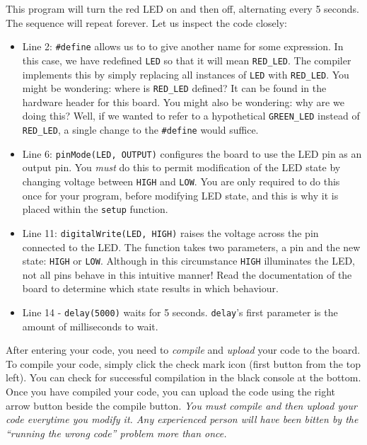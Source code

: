 \documentclass{article}
\begin{document}
This program will turn the red LED on and then off, alternating every 5 seconds.  The sequence will repeat forever.  Let us inspect the code closely:
\begin{itemize}
	\item Line 2: \texttt{\#define} allows us to to give another name for some expression. In this case, we have redefined \texttt{LED} so that it will mean \texttt{RED\_LED}. The compiler implements this by simply replacing all instances of \texttt{LED} with \texttt{RED\_LED}. You might be wondering: where is \texttt{RED\_LED} defined? It can be found in the hardware header for this board. You might also be wondering: why are we doing this? Well, if we wanted to refer to a hypothetical \texttt{GREEN\_LED} instead of \texttt{RED\_LED}, a single change to the \texttt{\#define} would suffice.

	\item Line 6: \texttt{pinMode(LED, OUTPUT)} configures the board to use the LED pin as an output pin.  You \emph{must} do this to permit modification of the LED state by changing voltage between \texttt{HIGH} and \texttt{LOW}.  You are only required to do this once for your program, before modifying LED state, and this is why it is placed within the \texttt{setup} function.

	\item Line 11: \texttt{digitalWrite(LED, HIGH)} raises the voltage across the pin connected to the LED.  The function takes two parameters, a pin and the new state: \texttt{HIGH} or \texttt{LOW}.  Although in this circumstance \texttt{HIGH} illuminates the LED, not all pins behave in this intuitive manner!  Read the documentation of the board to determine which state results in which behaviour.

	\item Line 14 - \texttt{delay(5000)} waits for 5 seconds. \texttt{delay}'s first parameter is the amount of milliseconds to wait.

\end{itemize}

After entering your code, you need to \emph{compile} and \emph{upload} your code to the board.  To compile your code, simply click the check mark icon (first button from the top left).  You can check for successful compilation in the black console at the bottom.  Once you have compiled your code, you can upload the code using the right arrow button beside the compile button.  \emph{You must compile and then upload your code everytime you modify it. Any experienced person will have been bitten by the ``running the wrong code'' problem more than once.}
\end{document}

